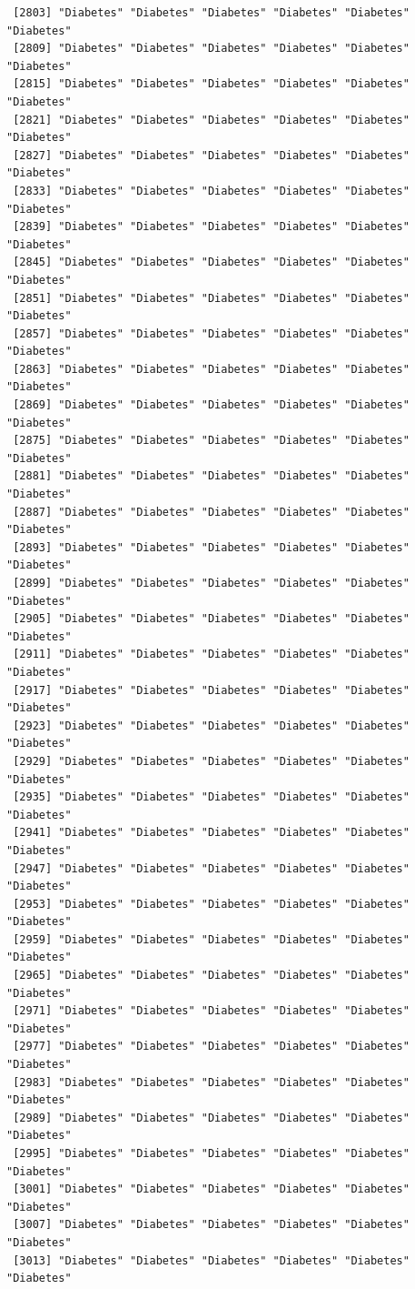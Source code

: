 \documentclass[
  letterpaper,
  DIV=11,
  numbers=noendperiod]{scrartcl}
\begin{document}
\begin{verbatim}
 [2803] "Diabetes" "Diabetes" "Diabetes" "Diabetes" "Diabetes" "Diabetes"
 [2809] "Diabetes" "Diabetes" "Diabetes" "Diabetes" "Diabetes" "Diabetes"
 [2815] "Diabetes" "Diabetes" "Diabetes" "Diabetes" "Diabetes" "Diabetes"
 [2821] "Diabetes" "Diabetes" "Diabetes" "Diabetes" "Diabetes" "Diabetes"
 [2827] "Diabetes" "Diabetes" "Diabetes" "Diabetes" "Diabetes" "Diabetes"
 [2833] "Diabetes" "Diabetes" "Diabetes" "Diabetes" "Diabetes" "Diabetes"
 [2839] "Diabetes" "Diabetes" "Diabetes" "Diabetes" "Diabetes" "Diabetes"
 [2845] "Diabetes" "Diabetes" "Diabetes" "Diabetes" "Diabetes" "Diabetes"
 [2851] "Diabetes" "Diabetes" "Diabetes" "Diabetes" "Diabetes" "Diabetes"
 [2857] "Diabetes" "Diabetes" "Diabetes" "Diabetes" "Diabetes" "Diabetes"
 [2863] "Diabetes" "Diabetes" "Diabetes" "Diabetes" "Diabetes" "Diabetes"
 [2869] "Diabetes" "Diabetes" "Diabetes" "Diabetes" "Diabetes" "Diabetes"
 [2875] "Diabetes" "Diabetes" "Diabetes" "Diabetes" "Diabetes" "Diabetes"
 [2881] "Diabetes" "Diabetes" "Diabetes" "Diabetes" "Diabetes" "Diabetes"
 [2887] "Diabetes" "Diabetes" "Diabetes" "Diabetes" "Diabetes" "Diabetes"
 [2893] "Diabetes" "Diabetes" "Diabetes" "Diabetes" "Diabetes" "Diabetes"
 [2899] "Diabetes" "Diabetes" "Diabetes" "Diabetes" "Diabetes" "Diabetes"
 [2905] "Diabetes" "Diabetes" "Diabetes" "Diabetes" "Diabetes" "Diabetes"
 [2911] "Diabetes" "Diabetes" "Diabetes" "Diabetes" "Diabetes" "Diabetes"
 [2917] "Diabetes" "Diabetes" "Diabetes" "Diabetes" "Diabetes" "Diabetes"
 [2923] "Diabetes" "Diabetes" "Diabetes" "Diabetes" "Diabetes" "Diabetes"
 [2929] "Diabetes" "Diabetes" "Diabetes" "Diabetes" "Diabetes" "Diabetes"
 [2935] "Diabetes" "Diabetes" "Diabetes" "Diabetes" "Diabetes" "Diabetes"
 [2941] "Diabetes" "Diabetes" "Diabetes" "Diabetes" "Diabetes" "Diabetes"
 [2947] "Diabetes" "Diabetes" "Diabetes" "Diabetes" "Diabetes" "Diabetes"
 [2953] "Diabetes" "Diabetes" "Diabetes" "Diabetes" "Diabetes" "Diabetes"
 [2959] "Diabetes" "Diabetes" "Diabetes" "Diabetes" "Diabetes" "Diabetes"
 [2965] "Diabetes" "Diabetes" "Diabetes" "Diabetes" "Diabetes" "Diabetes"
 [2971] "Diabetes" "Diabetes" "Diabetes" "Diabetes" "Diabetes" "Diabetes"
 [2977] "Diabetes" "Diabetes" "Diabetes" "Diabetes" "Diabetes" "Diabetes"
 [2983] "Diabetes" "Diabetes" "Diabetes" "Diabetes" "Diabetes" "Diabetes"
 [2989] "Diabetes" "Diabetes" "Diabetes" "Diabetes" "Diabetes" "Diabetes"
 [2995] "Diabetes" "Diabetes" "Diabetes" "Diabetes" "Diabetes" "Diabetes"
 [3001] "Diabetes" "Diabetes" "Diabetes" "Diabetes" "Diabetes" "Diabetes"
 [3007] "Diabetes" "Diabetes" "Diabetes" "Diabetes" "Diabetes" "Diabetes"
 [3013] "Diabetes" "Diabetes" "Diabetes" "Diabetes" "Diabetes" "Diabetes"

\end{verbatim}
\end{document}
